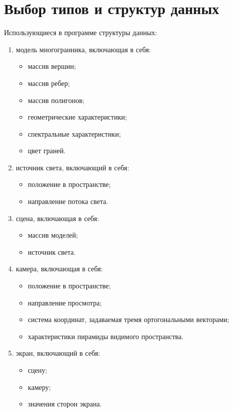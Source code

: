 \section{Выбор типов и структур данных}

Использующиеся в программе структуры данных:
\begin{enumerate}
	\item модель многогранника, включающая в себя:
	\begin{itemize}[label=--]
		\item массив вершин;
		\item массив ребер;
		\item массив полигонов;
		\item геометрические характеристики;
		\item спектральные характеристики;
		\item цвет граней.
	\end{itemize}
	\item источник света, включающий в себя:
	\begin{itemize}[label=--]
		\item положение в пространстве;
		\item направление потока света.
	\end{itemize}
	\item сцена, включающая в себя:
	\begin{itemize}[label=--]
		\item массив моделей;
		\item источник света.
	\end{itemize}
	\item камера, включающая в себя:
	\begin{itemize}[label=--]
		\item положение в пространстве;
		\item направление просмотра;
		\item система координат, задаваемая тремя ортогональными векторами;
		\item характеристики пирамиды видимого пространства.
	\end{itemize}
	\item экран, включающий в себя:
	\begin{itemize}[label=--]
		\item сцену;
		\item камеру;
		\item значения сторон экрана.
	\end{itemize}
\end{enumerate}

